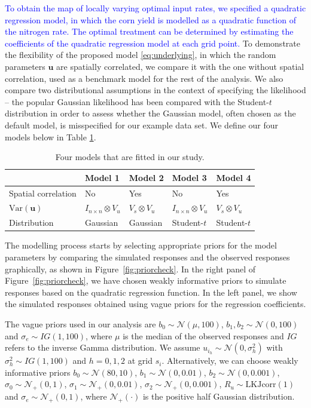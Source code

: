 \documentclass[a4paper]{article}   	%
\newcommand{\Var}{\mathrm{Var}}
\newcommand{\N}{\mathcal{N}}
\begin{document}
	\textcolor{blue}{To obtain the map of locally varying optimal input rates, we specified a quadratic regression model, in which the corn yield is modelled as a quadratic function of the nitrogen rate. The optimal treatment can be determined by estimating the coefficients of the quadratic regression model at each grid point.} To demonstrate the flexibility of the proposed model \eqref{eq:underlying}, in which the random parameters $\bm{u}$ are spatially correlated, we compare it with the one without spatial correlation, used as a benchmark model for the rest of the analysis. We also compare two distributional assumptions in the context of specifying the likelihood -- the popular Gaussian likelihood has been compared with the Student-$t$ distribution in order to assess whether the  Gaussian model, often chosen as the default model, is misspecified for our example data set. We define our four models below in Table \ref{tb:models}. 
	
	
	\begin{table}[!htp]
		\centering
		\begin{tabular}{*{5}{l}} \toprule
			& Model 1 & Model 2& Model 3& Model 4  \\ \midrule
			Spatial correlation & No & Yes & No & Yes \\ 
			$\Var(\bm{u})$ &  $I_{n\times n}\otimes V_u$ & $V_s\otimes V_u$ & $I_{n\times n}\otimes V_u$ & $V_s\otimes V_u$ \\ 
			Distribution & Gaussian & Gaussian & Student-$t$ & Student-$t$ \\
			\bottomrule
		\end{tabular}\caption{Four models that are fitted in our study.}\label{tb:models}
	\end{table}
	
	
	The modelling process starts by selecting appropriate priors for the model parameters by comparing the simulated responses and the observed responses graphically, as shown in Figure~\ref{fig:priorcheck}. In the right panel of Figure~\ref{fig:priorcheck}, we have chosen weakly informative priors to simulate responses based on the quadratic regression function. In the left panel, we show the simulated responses obtained using vague priors for the regression coefficients.
	
	The vague priors used in our analysis are $b_0\sim \N(\mu,100)$, $b_1,b_2\sim \N(0,100)$ and $\sigma_e\sim IG(1,100)$, where $\mu$ is the median of the observed responses and $IG$ refers to the inverse Gamma distribution. We assume $u_{i_h}\sim \N(0,\sigma_{h}^2)$ with $\sigma_h^2\sim IG(1,100)$ and $h=0, 1, 2$ at grid $s_i$.  Alternatively, we can choose weakly informative priors $b_0\sim \N(80,10)$, $b_1\sim \N(0,0.01)$, $b_2\sim \N(0,0.001)$, $\sigma_{0}\sim \N_+(0,1)$, $\sigma_{1}\sim \N_+(0,0.01)$, $\sigma_{2}\sim \N_+(0,0.001)$, $R_u\sim \mbox{LKJcorr}(1)$ and $\sigma_e\sim \N_+(0,1)$, where $\N_+(\cdot)$ is the positive half Gaussian distribution. 
	
\end{document}

